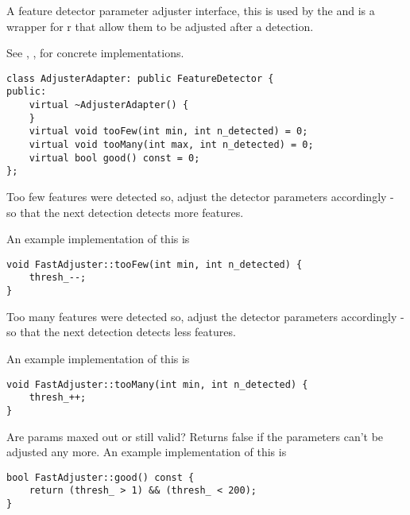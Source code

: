 A feature detector parameter adjuster interface, this is used by the 
and is a wrapper for  r that allow them to be adjusted after a detection.

See  , ,  for concrete implementations.
\begin{lstlisting}
class AdjusterAdapter: public FeatureDetector {
public:
	virtual ~AdjusterAdapter() {
	}
	virtual void tooFew(int min, int n_detected) = 0;
	virtual void tooMany(int max, int n_detected) = 0;
	virtual bool good() const = 0;
};
\end{lstlisting}
Too few features were detected so, adjust the detector parameters accordingly - so that the next
detection detects more features.
\begin{description}
\end{description}
An example implementation of this is
\begin{lstlisting}
void FastAdjuster::tooFew(int min, int n_detected) {
	thresh_--;
}
\end{lstlisting}

Too many features were detected so, adjust the detector parameters accordingly - so that the next
detection detects less features.
\begin{description}
\end{description}
An example implementation of this is
\begin{lstlisting}
void FastAdjuster::tooMany(int min, int n_detected) {
	thresh_++;
}
\end{lstlisting}

Are params maxed out or still valid? Returns false if the parameters can't be adjusted any more.
An example implementation of this is
\begin{lstlisting}
bool FastAdjuster::good() const {
	return (thresh_ > 1) && (thresh_ < 200);
}
\end{lstlisting}
	  
